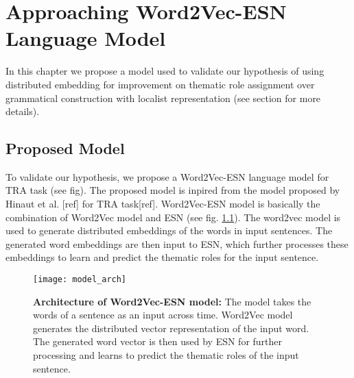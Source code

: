 \chapter{Approaching Word2Vec-ESN Language Model}\label{approach}

In this chapter we propose a model used to validate our hypothesis of using distributed embedding for improvement on thematic role assignment over grammatical construction with localist representation (see section for more details).

\section{Proposed Model}

To validate our hypothesis, we propose a Word2Vec-ESN language model for TRA task (see fig). The proposed model is inpired from the model proposed by Hinaut et al. [ref] for TRA task[ref]. Word2Vec-ESN model is basically the combination of Word2Vec model and ESN (see fig. \ref{fig:model_arch}). The word2vec model is used to generate distributed embeddings of the words in input sentences. The generated word embeddings are then input to ESN, which further processes these embeddings to learn and predict the thematic roles for the input sentence. 

\begin{figure}[hbtp]
\centering
\texttt{[image: model\_arch]}
\caption{\textbf{Architecture of Word2Vec-ESN model:} The model takes the words of a sentence as an input across time. Word2Vec model generates the distributed vector representation of the input word. The generated word vector is then used by ESN for further processing and learns to predict the thematic roles of the input sentence.}
\label{fig:model_arch}
\end{figure}

